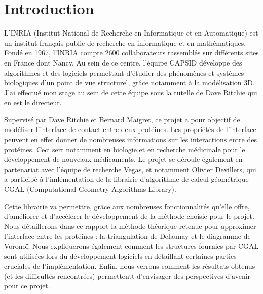 \chapter*{Introduction}

  L'INRIA (Institut National de Recherche en Informatique et en Automatique) est un
  institut français public de recherche en informatique et en mathématiques. Fondé
  en 1967, l'INRIA compte 2600 collaborateurs rassemblés sur différents sites en
  France dont Nancy. Au sein de ce centre, l'équipe CAPSID développe des algorithmes
  et des logiciels permettant d'étudier des phénomènes et systèmes biologiques
  d'un point de vue structurel, grâce notamment à la modélisation 3D. J'ai effectué
  mon stage au sein de cette équipe sous la tutelle de Dave Ritchie qui en est le
  directeur.

  Supervisé par Dave Ritchie et Bernard Maigret, ce projet a pour objectif de
  modéliser l'interface de contact entre deux protéines. Les propriétés de l'interface
  peuvent en effet donner de nombreuses informations sur les interactions entre
  des protéines. Ceci sert notamment en biologie et en recherche médicinale pour
  le développement de nouveaux médicaments.
  Le projet se déroule également en partenariat avec l'équipe de recherche Vegas, et
  notamment Olivier Devillers, qui a participé à l'imlémentation de
  la librairie d'algorithme de calcul géométrique CGAL (Computational Geometry
  Algorithms Library).

  Cette librairie va permettre, grâce aux nombreuses fonctionnalités qu'elle offre,
  d'améliorer et d'accélerer le développement de la méthode choisie pour le projet.
  Nous détaillerons dans ce rapport la méthode théorique retenue pour approximer l'interface
  entre les protéines : la triangulation de Delaunay et le diagramme de Voronoï. Nous
  expliquerons également comment les structures fournies par CGAL sont utilisées lors
  du développement logiciels en détaillant certaines parties cruciales de l'implémentation.
  Enfin, nous verrons comment les résultats obtenus (et les difficultés rencontrées)
  permettentt d'envisager des perspectives d'avenir pour ce projet.
